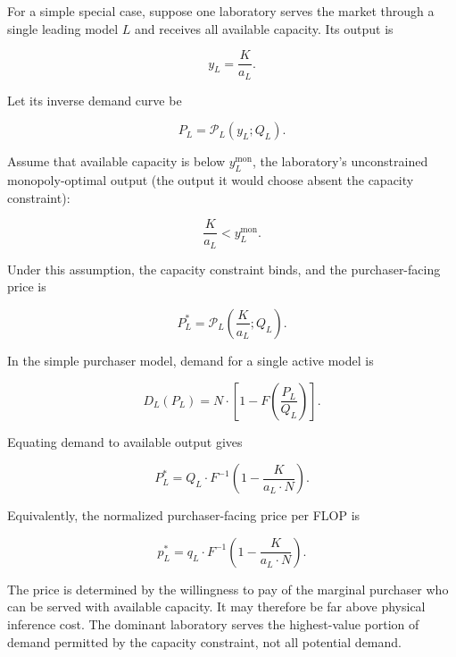 \documentclass[11pt]{article}
\begin{document}
For a simple special case, suppose one laboratory serves the market through a single leading model $L$ and receives all available capacity. Its output is

\begin{equation}y_L=\frac{K}{a_L}.\end{equation}

Let its inverse demand curve be

\begin{equation}P_L=\mathcal P_L(y_L;Q_L).\end{equation}

Assume that available capacity is below $y_L^{\mathrm{mon}}$, the laboratory's unconstrained monopoly-optimal output (the output it would choose absent the capacity constraint):

\begin{equation}\frac{K}{a_L}<y_L^{\mathrm{mon}}.\end{equation}

Under this assumption, the capacity constraint binds, and the purchaser-facing price is

\begin{equation}P_L^*=\mathcal P_L\left(\frac{K}{a_L};Q_L\right).\end{equation}

In the simple purchaser model, demand for a single active model is

\begin{equation}D_L(P_L)=N\cdot\left[1-F\left(\frac{P_L}{Q_L}\right)\right].\end{equation}

Equating demand to available output gives

\begin{equation}P_L^*=Q_L\cdot F^{-1}\left(1-\frac{K}{a_L\cdot N}\right).\end{equation}

Equivalently, the normalized purchaser-facing price per FLOP is

\begin{equation}p_L^*=q_L\cdot F^{-1}\left(1-\frac{K}{a_L\cdot N}\right).\end{equation}

The price is determined by the willingness to pay of the marginal purchaser who can be served with available capacity. It may therefore be far above physical inference cost. The dominant laboratory serves the highest-value portion of demand permitted by the capacity constraint, not all potential demand.
\end{document}
